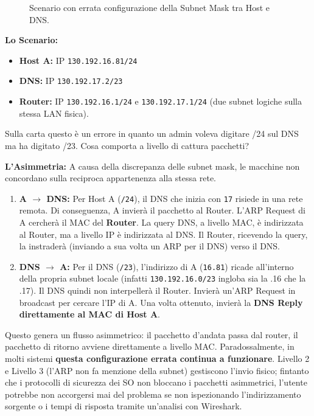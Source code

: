 \begin{figure}[H]
    \centering
    \caption{Scenario con errata configurazione della Subnet Mask tra Host e DNS.}
    \label{fig:asymmetric_routing}
\end{figure}

\textbf{Lo Scenario:}
\begin{itemize}
    \item \textbf{Host A:} IP \texttt{130.192.16.81/24}
    \item \textbf{DNS:} IP \texttt{130.192.17.2/23}
    \item \textbf{Router:} IP \texttt{130.192.16.1/24} e \texttt{130.192.17.1/24} (due subnet logiche sulla stessa LAN fisica).
\end{itemize}
Sulla carta questo è un errore in quanto un admin voleva digitare /24 sul DNS ma ha digitato /23. Cosa comporta a livello di cattura pacchetti?

\textbf{L'Asimmetria:}
A causa della discrepanza delle subnet mask, le macchine non concordano sulla reciproca appartenenza alla stessa rete.
\begin{enumerate}
    \item \textbf{A $\rightarrow$ DNS:} Per Host A (\texttt{/24}), il DNS che inizia con \texttt{17} risiede in una rete remota. Di conseguenza, A invierà il pacchetto al Router. L'ARP Request di A cercherà il MAC del \textbf{Router}. La query DNS, a livello MAC, è indirizzata al Router, ma a livello IP è indirizzata al DNS. Il Router, ricevendo la query, la instraderà (inviando a sua volta un ARP per il DNS) verso il DNS.
    \item \textbf{DNS $\rightarrow$ A:} Per il DNS (\texttt{/23}), l'indirizzo di A (\texttt{16.81}) ricade all'interno della propria subnet locale (infatti \texttt{130.192.16.0/23} ingloba sia la .16 che la .17). Il DNS quindi non interpellerà il Router. Invierà un'ARP Request in broadcast per cercare l'IP di A. Una volta ottenuto, invierà la \textbf{DNS Reply direttamente al MAC di Host A}.
\end{enumerate}

Questo genera un flusso asimmetrico: il pacchetto d'andata passa dal router, il pacchetto di ritorno avviene direttamente a livello MAC.
Paradossalmente, in molti sistemi \textbf{questa configurazione errata continua a funzionare}. Livello 2 e Livello 3 (l'ARP non fa menzione della subnet) gestiscono l'invio fisico; fintanto che i protocolli di sicurezza dei SO non bloccano i pacchetti asimmetrici, l'utente potrebbe non accorgersi mai del problema se non ispezionando l'indirizzamento sorgente o i tempi di risposta tramite un'analisi con Wireshark.




